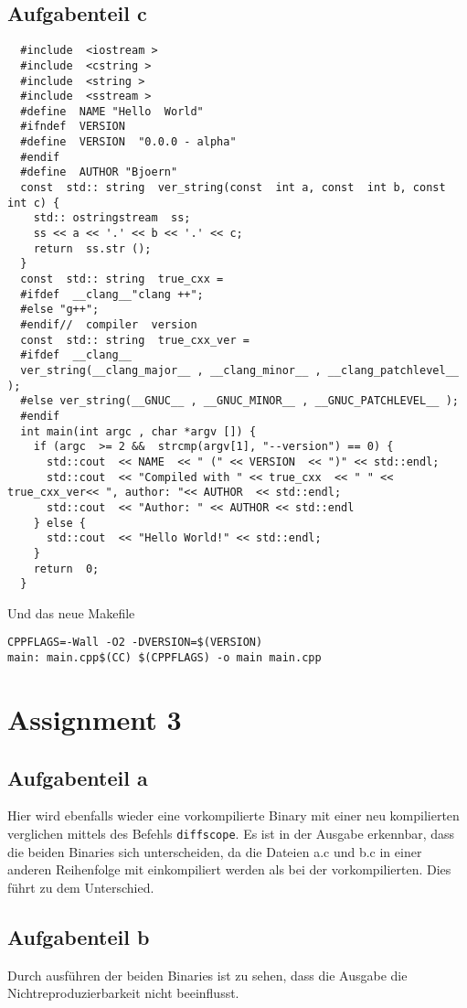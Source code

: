 \documentclass[a4paper,12pt,
headsepline,           %
twoside,               %
pointlessnumbers,      %
bibtotoc,              %
BCOR15mm               %
]{scrbook}
\begin{document}
\subsection*{Aufgabenteil c}
\begin{lstlisting}
  #include  <iostream >
  #include  <cstring >
  #include  <string >
  #include  <sstream >
  #define  NAME "Hello  World"
  #ifndef  VERSION
  #define  VERSION  "0.0.0 - alpha"
  #endif
  #define  AUTHOR "Bjoern"
  const  std:: string  ver_string(const  int a, const  int b, const  int c) {
    std:: ostringstream  ss;
    ss << a << '.' << b << '.' << c;
    return  ss.str ();
  }
  const  std:: string  true_cxx =
  #ifdef  __clang__"clang ++";
  #else "g++";
  #endif//  compiler  version
  const  std:: string  true_cxx_ver =
  #ifdef  __clang__
  ver_string(__clang_major__ , __clang_minor__ , __clang_patchlevel__ );
  #else ver_string(__GNUC__ , __GNUC_MINOR__ , __GNUC_PATCHLEVEL__ );
  #endif
  int main(int argc , char *argv []) {
    if (argc  >= 2 &&  strcmp(argv[1], "--version") == 0) {
      std::cout  << NAME  << " (" << VERSION  << ")" << std::endl;
      std::cout  << "Compiled with " << true_cxx  << " " << true_cxx_ver<< ", author: "<< AUTHOR  << std::endl;
      std::cout  << "Author: " << AUTHOR << std::endl
    } else {
      std::cout  << "Hello World!" << std::endl;
    }
    return  0;
  }
\end{lstlisting}
Und das neue Makefile
\begin{lstlisting}
CPPFLAGS=-Wall -O2 -DVERSION=$(VERSION)
main: main.cpp$(CC) $(CPPFLAGS) -o main main.cpp
\end{lstlisting}

\section*{Assignment 3}
\subsection*{Aufgabenteil a}
Hier wird ebenfalls wieder eine vorkompilierte Binary mit einer neu kompilierten verglichen mittels des Befehls \texttt{diffscope}.
Es ist in der Ausgabe erkennbar, dass die beiden Binaries sich unterscheiden, da die Dateien a.c und b.c in einer anderen Reihenfolge mit einkompiliert werden als bei der vorkompilierten. Dies führt zu dem Unterschied.

\subsection*{Aufgabenteil b}
Durch ausführen der beiden Binaries ist zu sehen, dass die Ausgabe die Nichtreproduzierbarkeit nicht beeinflusst.
\end{document}
